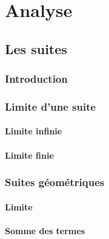 \documentclass[12pt,french]{book}
\begin{document}
\part{Analyse}

\chapter{Les suites}

\section{Introduction}

\section{Limite d'une suite}
\subsection{Limite infinie}
\subsection{Limite finie}

\section{Suites géométriques}
\subsection{Limite}
\subsection{Somme des termes}
\end{document}
